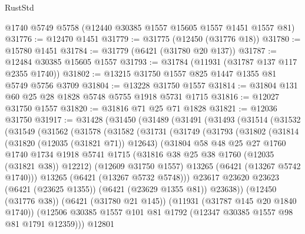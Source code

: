 \begin{lexlean}{RustStd}
\begin{coremodule}
    @1740
    @5749
    @5758
    (@12440 @30385 @1557 @15605 @1557 @1451 @1557 @81)
@31776 := @12470 @1451
@31779 := @31775 (@12450 (@31776 @18))
@31780 := @15780 @1451
@31784 := @31779 (@6421 (@31780 @20 @137))
@31787 := @12484 @30385 @15605 @1557
@31793 := @31784 (@11931 (@31787 @137 @117 @2355 @1740))
@31802 := @13215 @31750 @1557 @825 @1447 @1355 @81 @5749 @5756 @3709
@31804 := @13228 @31750 @1557
@31814 := @31804 @131 @60 @25 @28 @1828 @5748 @5755 @1918 @5731 @1715
@31816 := @12027 @31750 @1557
@31820 := @31816 @71 @25 @71 @1828
@31821 := @12036 @31750
@31917 := @31428
    (@31450
      (@31489
        (@31491
          (@31493
            (@31514
              (@31532
                (@31549
                  (@31562
                    (@31578
                      (@31582
                        (@31731
                          (@31749
                            (@31793
                              (@31802
                                (@31814
                                  (@31820 (@12035 (@31821 @71)) @12643)
                                  (@31804
                                    @58
                                    @48
                                    @25
                                    @27
                                    @1760
                                    @1740
                                    @1734
                                    @1918
                                    @5741
                                    @1715
                                    (@31816 @38 @25 @38 @1760 (@12035 (@31821 @38)) @12212)
                                    (@12609 @31750 @1557)
                                    @13265
                                    (@6421 (@13267 @5742 @1740)))
                                  @13265
                                  (@6421 (@13267 @5732 @5748)))
                                @23617
                                @23620
                                @23623
                                (@6421 (@23625 @1355))
                                (@6421 (@23629 @1355 @81))
                                @23638))
                            (@12450 (@31776 @38))
                            (@6421 (@31780 @21 @145))
                            (@11931 (@31787 @145 @20 @1840 @1740))
                            (@12506
                              @30385
                              @1557
                              @101
                              @81
                              @1792
                              (@12347 @30385 @1557 @98 @81 @1791 @12359)))
                          @12801

\end{coremodule}
\end{lexlean}
